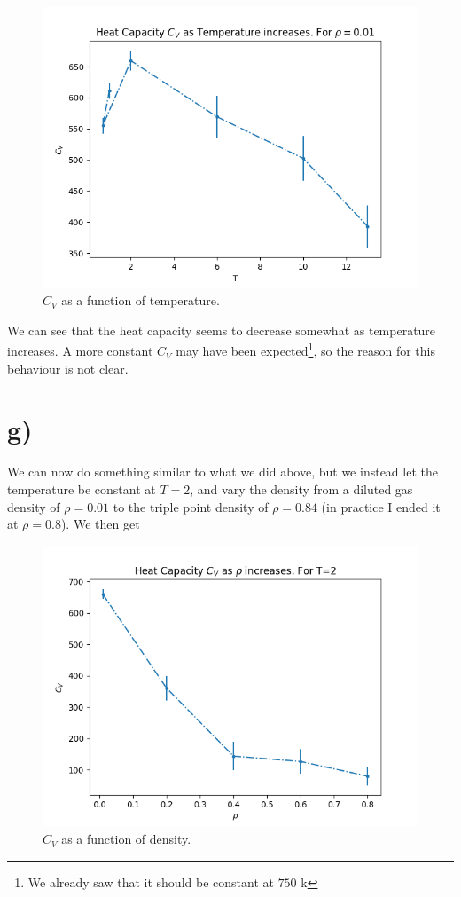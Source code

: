 \documentclass[a4paper,norsk, 10pt]{article}
\begin{document}
\begin{figure}[H]
\centering
\includegraphics[scale=0.5]{CVvsT.png}
\caption{$C_V$ as a function of temperature.}
\label{fig:isoTherm}
\end{figure}

We can see that the heat capacity seems to decrease somewhat as temperature increases. A more constant $C_V$ may have been expected\footnote{We already saw that it should be constant at $750$ k}, so the reason for this behaviour is not clear.

\section{g)}

We can now do something similar to what we did above, but we instead let the temperature be constant at $T=2$, and vary the density from a diluted gas density of $\rho = 0.01$ to the triple point density of $\rho = 0.84$ (in practice I ended it at $\rho = 0.8$). We then get

\begin{figure}[H]
\centering
\includegraphics[scale=0.5]{CVvsRho.png}
\caption{$C_V$ as a function of density.}
\label{fig:isoTherm}
\end{figure}
\end{document}
